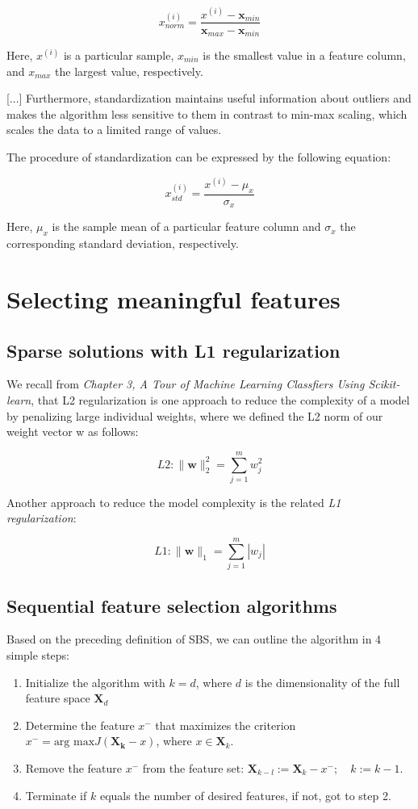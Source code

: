 \documentclass[letterpaper]{report}
\begin{document}
\[
x_{norm}^{(i)} = \frac{x^{(i)} - \mathbf{x}_{min}}{\mathbf{x}_{max} - \mathbf{x}_{min}}
\]

Here, $x^{(i)}$ is a particular sample, $x_{min}$ is the smallest value in a feature column, and $x_{max}$ the largest value, respectively.

[...]  Furthermore, standardization maintains useful information about outliers and makes the algorithm less sensitive to them in contrast to min-max scaling, which scales
the data to a limited range of values.

The procedure of standardization can be expressed by the following equation:

\[
x_{std}^{(i)} = \frac{x^{(i)} - \mu_{x}}{\sigma_{x}}
\]

Here, $\mu_{x}$ is the sample mean of a particular feature column and $\sigma_{x}$ the corresponding standard deviation, respectively.

\section{Selecting meaningful features}
\subsection{Sparse solutions with L1 regularization}

We recall from \textit{Chapter 3, A Tour of Machine Learning Classfiers Using Scikit-learn}, that L2 regularization is one approach to reduce the complexity of a model by penalizing large individual weights, where we defined the L2 norm of our weight vector w as follows:

\[
L2: \lVert \mathbf{w} \rVert^{2}_{2} = \sum_{j=1}^{m} w^{2}_{j}
\]

Another approach to reduce the model complexity is the related \textit{L1 regularization}:

\[
L1: \lVert \mathbf{w} \rVert_{1} = \sum_{j=1}^{m} |w_j|
\]


\subsection{Sequential feature selection algorithms}

Based on the preceding definition of SBS, we can outline the algorithm in 4 simple steps:

\begin{enumerate}
\item Initialize the algorithm with $k=d$, where $d$  is the dimensionality of the full feature space $\mathbf{X}_d$
\item Determine the feature $x^{-}$ that maximizes the criterion $x^{-} = \text{arg max} J(\mathbf{X_k} - x)$, where  $x \in \mathbf{X}_k$.
\item Remove the feature $x^-$ from the feature set: $\mathbf{X}_{k-l} := \mathbf{X}_k - x^{-}; \quad k:= k-1$.
\item Terminate if $k$ equals the number of desired features, if not, got to step 2.

\end{enumerate}
\end{document}
